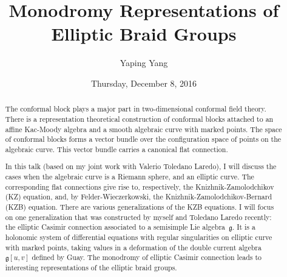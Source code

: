 \documentclass{UAmathtalk}
\author{Yaping Yang}
\title{Monodromy Representations of\\ Elliptic Braid Groups}
\date{Thursday, December 8, 2016}
\begin{document}
\maketitle

\begin{abstract}
The conformal block plays a major part in two-dimensional conformal field theory. There is a representation theoretical construction of conformal blocks attached to an affine Kac-Moody algebra and a smooth algebraic curve with marked points. The space of conformal blocks forms a vector bundle over the configuration space of points on the algebraic curve. This vector bundle carries a canonical flat connection.

In this talk (based on my joint work with Valerio Toledano Laredo), I will discuss the cases when the algebraic curve is a Riemann sphere, and an elliptic curve. The corresponding flat connections give rise to, respectively, the Knizhnik-Zamolodchikov (KZ) equation, and, by Felder-Wieczerkowski, the Knizhnik-Zamolodchikov-Bernard (KZB) equation. There are various generalizations of the KZB equations. I will focus on one generalization that was constructed by myself and Toledano Laredo recently: the elliptic Casimir connection associated to a semisimple Lie algebra~$\mathfrak{g}$. It is a holonomic system of differential equations with regular singularities on elliptic curve with marked points, taking values in a deformation of the double current algebra~$\mathfrak{g}[u, v]$ defined by Guay. The monodromy of elliptic Casimir connection leads to interesting representations of the elliptic braid groups.
\end{abstract}
\end{document}
